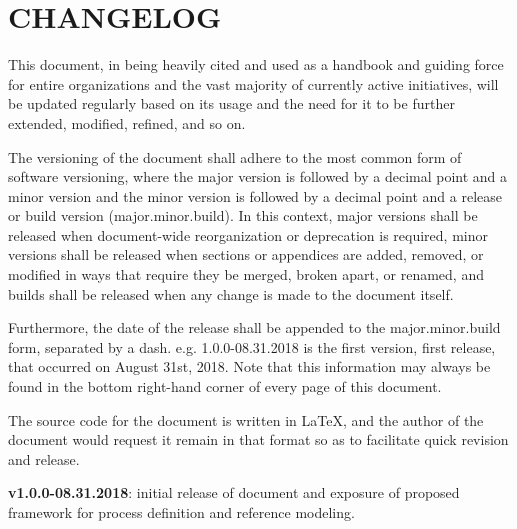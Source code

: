 \section{CHANGELOG\label{sec:changelog}}
\begin{adjustwidth}{0em}{0pt}

	This document, in being heavily cited and used as a handbook and guiding force for entire organizations and the vast majority of currently active initiatives, will be updated regularly based on its usage and the need for it to be further extended, modified, refined, and so on. 

	The versioning of the document shall adhere to the most common form of software versioning, where the major version is followed by a decimal point and a minor version and the minor version is followed by a decimal point and a release or build version (major.minor.build). In this context, major versions shall be released when document-wide reorganization or deprecation is required, minor versions shall be released when sections or appendices are added, removed, or modified in ways that require they be merged, broken apart, or renamed, and builds shall be released when any change is made to the document itself. 

	Furthermore, the date of the release shall be appended to the major.minor.build form, separated by a dash. e.g. 1.0.0-08.31.2018 is the first version, first release, that occurred on August 31st, 2018. Note that this information may always be found in the bottom right-hand corner of every page of this document.

	The source code for the document is written in LaTeX, and the author of the document would request it remain in that format so as to facilitate quick revision and release. 

	\begin{compactitem}

		\item {\bf v1.0.0-08.31.2018}: initial release of document and exposure of proposed framework for process definition and reference modeling. 

	\end{compactitem}

\end{adjustwidth}